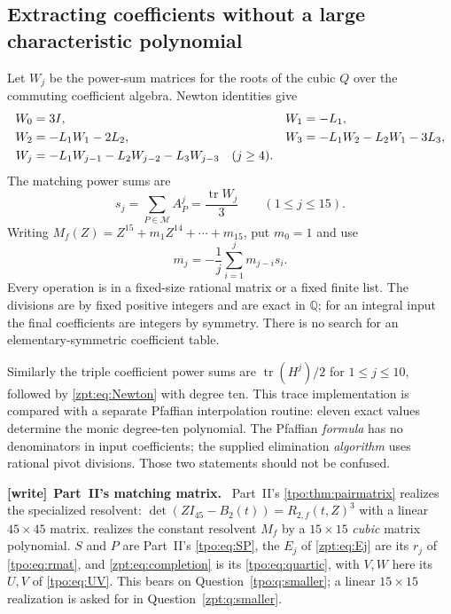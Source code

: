 \documentclass[11pt,letterpaper]{article}
\numberwithin{equation}{section}
\theoremstyle{definition}
\theoremstyle{remark}
\newcommand{\QQ}{\mathbb Q}
\newcommand{\Rtwo}{R_{2,f}}
\newcommand{\tpoM}{\mathcal M}
\DeclareMathOperator{\tr}{tr}
\newenvironment{writenote}[1][]{\par\smallskip\begingroup\small
 \noindent\textbf{[write]}\if\relax\detokenize{#1}\relax\else~\textbf{#1.}\fi\ }%
 {\par\endgroup\smallskip}
\begin{document}
\subsection{Extracting coefficients without a large characteristic polynomial}
Let $W_j$ be the power-sum matrices for the roots of the cubic $Q$ over
the commuting coefficient algebra. Newton identities give
\begin{align}
 W_0&=3I,& W_1&=-L_1,\notag\\
 W_2&=-L_1W_1-2L_2,&
 W_3&=-L_1W_2-L_2W_1-3L_3,\label{zpt:eq:Winitial}\\
 W_j&=-L_1W_{j-1}-L_2W_{j-2}-L_3W_{j-3}\quad(j\ge4).\notag
\end{align}
The matching power sums are
\begin{equation}
 s_j=\sum_{P\in\tpoM}A_P^j=\frac{\tr W_j}{3}\qquad(1\le j\le15).
 \label{zpt:eq:traces}
\end{equation}
Writing $M_f(Z)=Z^{15}+m_1Z^{14}+\cdots+m_{15}$, put $m_0=1$ and use
\begin{equation}
 m_j=-\frac1j\sum_{i=1}^j m_{j-i}s_i.\label{zpt:eq:Newton}
\end{equation}
Every operation is in a fixed-size rational matrix or a fixed finite list.
The divisions are by fixed positive integers and are exact in $\QQ$;
for an integral input the final coefficients are integers by symmetry.
There is no search for an elementary-symmetric coefficient table.

Similarly the triple coefficient power sums are $\tr(H^j)/2$ for
$1\le j\le10$, followed by \eqref{zpt:eq:Newton} with degree ten. This trace
implementation is compared with a separate Pfaffian interpolation routine:
eleven exact values determine the monic degree-ten polynomial. The
Pfaffian \emph{formula} has no denominators in input coefficients; the
supplied elimination \emph{algorithm} uses rational pivot divisions.
Those two statements should not be confused.

\begin{writenote}[Part~II's matching matrix]
Part~II's \cref{tpo:thm:pairmatrix} realizes the specialized resolvent:
$\det(ZI_{45}-B_2(t))=\Rtwo(t,Z)^3$ with a linear $45\times45$ matrix.
 realizes the constant resolvent $M_f$ by a
$15\times15$ \emph{cubic} matrix polynomial. $S$ and $P$ are Part~II's
\eqref{tpo:eq:SP}, the $E_j$ of \eqref{zpt:eq:Ej} are its $r_j$ of
\eqref{tpo:eq:rmat}, and \eqref{zpt:eq:completion} is its
\eqref{tpo:eq:quartic}, with $V,W$ here its $U,V$ of \eqref{tpo:eq:UV}.
This bears on Question~\ref{tpo:q:smaller}; a linear $15\times15$
realization is asked for in Question~\ref{zpt:q:smaller}.
\end{writenote}
\end{document}

